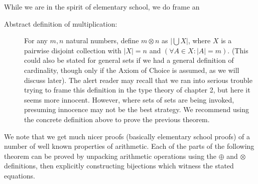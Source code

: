 \documentclass[12pt]{book}
\begin{document}
While we are in the spirit of elementary school, we do frame an

\begin{description}

\item[Abstract definition of multiplication:]  For any $m,n$ natural numbers, define $m\otimes n$ as $|\bigcup X|$, where $X$ is a pairwise disjoint collection with $|X|=n$ and
$(\forall A \in X:|A|=m)$.  (This could also be stated for general sets if we had a general definition of cardinality, though only if the Axiom of Choice is assumed, as we will discuss later).  The alert reader may recall that we ran into serious trouble trying to frame this definition in the type theory of chapter 2, but here it seems more innocent.  However, where sets of sets are being invoked, presuming innocence may not be the best strategy.  We recommend using the concrete definition above to prove the previous theorem.

\end{description}

We note that we get much nicer proofs (basically elementary school proofs) of a number of well known properties of arithmetic.  Each of the parts of the following theorem can be proved by unpacking arithmetic operations using the $\oplus$ and $\otimes$ definitions, then explicitly constructing bijections which witness the stated equations.
\end{document}
